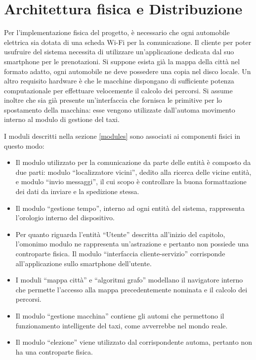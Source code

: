 \section{Architettura fisica e Distribuzione} \label{arch_fisica}
Per l'implementazione fisica del progetto, è necessario che ogni automobile elettrica sia dotata di una scheda Wi-Fi per la comunicazione. Il cliente per poter usufruire del sistema necessita di utilizzare un'applicazione dedicata dal suo smartphone per le prenotazioni. Si suppone esista già la mappa della città nel formato adatto, ogni automobile ne deve possedere una copia nel disco locale. Un altro requisito hardware è che le macchine dispongano di sufficiente potenza computazionale per effettuare velocemente il calcolo dei percorsi. Si assume inoltre che sia già presente un'interfaccia che fornisca le primitive per lo spostamento della macchina: esse vengono utilizzate dall'automa movimento interno al modulo di gestione del taxi.

I moduli descritti nella sezione \ref{modules} sono associati ai componenti fisici in questo modo:
\begin{itemize}
	\item Il modulo utilizzato per la comunicazione da parte delle entità è composto da due parti: modulo ``localizzatore vicini'', dedito alla ricerca delle vicine entità, e modulo ``invio messaggi'', il cui scopo è controllare la buona formattazione dei dati da inviare e la spedizione stessa.
	\item Il modulo ``gestione tempo'', interno ad ogni entità del sistema, rappresenta l'orologio interno del dispositivo.
	\item Per quanto riguarda l'entità ``Utente'' descritta all'inizio del capitolo, l'omonimo modulo ne rappresenta un'astrazione e pertanto non possiede una controparte fisica. Il modulo ``interfaccia cliente-servizio'' corrisponde all'applicazione sullo smartphone dell'utente.
	\item I moduli ``mappa città'' e ``algoritmi grafo'' modellano il navigatore interno che permette l'accesso alla mappa precedentemente nominata e il calcolo dei percorsi.
	\item Il modulo ``gestione macchina'' contiene gli automi che permettono il funzionamento intelligente del taxi, come avverrebbe nel mondo reale.
	\item Il modulo ``elezione'' viene utilizzato dal corrispondente automa, pertanto non ha una controparte fisica.
\end{itemize}

